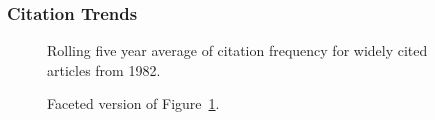 \documentclass[
  10pt,
  letterpaper,
  DIV=11,
  numbers=noendperiod,
  twoside]{scrartcl}
\begin{document}
\subsubsection*{Citation Trends}\label{sec-trends-1982}

\begin{figure}


\caption{\label{fig-citation-spaghetti-1982}Rolling five year average of
citation frequency for widely cited articles from 1982.}

\end{figure}%

\begin{figure}


\caption{\label{fig-citation-facet-1982}Faceted version of
Figure~\ref{fig-citation-spaghetti-1982}.}

\end{figure}%
\end{document}
